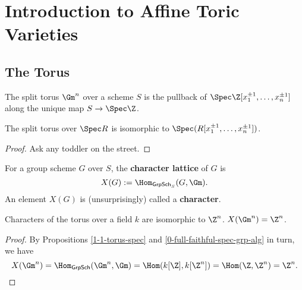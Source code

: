 \section{Introduction to Affine Toric Varieties}


\subsection{The Torus}


\begin{definition}
  \label{1-1-torus}
  \leanok

  The split torus $\Gm^n$ over a scheme $S$ is the pullback of
  $\Spec \Z[x_1^{\pm 1}, \dotsc, x_n^{\pm 1}]$ along the unique map $S \to \Spec \Z$.
\end{definition}


\begin{lemma}
  \label{1-1-torus-spec}
  \leanok

  The split torus over $\Spec R$ is isomorphic to $\Spec(R[x_1^{\pm 1}, \dotsc, x_n^{\pm 1}])$.
\end{lemma}
\begin{proof}
  \uses{}

  Ask any toddler on the street.
\end{proof}


\begin{definition}
  \label{1-1-char}
  \leanok

  For a group scheme $G$ over $S$, the {\bf character lattice} of $G$ is
  \[
    X(G) := \Hom_{\mathsf{GrpSch}_S}(G, \Gm).
  \]
  An element $X(G)$ is (unsurprisingly) called a {\bf character}.
\end{definition}

\begin{proposition}
  \label{1-1-char-torus}

  Characters of the torus over a field $k$ are isomorphic to $\Z^n$. $X(\Gm^n) = \Z^n$.
\end{proposition}
\begin{proof}

  By Propositions \ref{1-1-torus-spec} and \ref{0-full-faithful-spec-grp-alg} in turn, we have
  \[
    X(\Gm^n) = \Hom_{\mathsf{GrpSch}}(\Gm^n, \Gm) = \Hom(k[\Z], k[\Z^n]) = \Hom(\Z, \Z^n) = \Z^n.
  \]
\end{proof}


